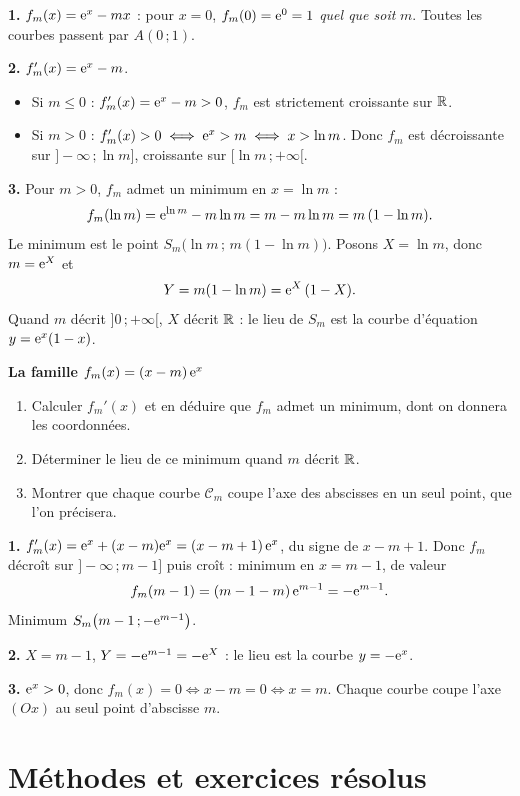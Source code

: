 \solution

\textbf{1.} $f_m(x)=\mathrm{e}^{x}-mx$ : pour $x=0$, $f_m(0)=\mathrm{e}^{0}=1$ \emph{quel que
soit} $m$. Toutes les courbes passent par $A(0\,;1)$.

\textbf{2.} $f_m'(x)=\mathrm{e}^{x}-m$.
\begin{itemize}[label=\textbullet]
	\item Si $m\leq 0$ : $f_m'(x)=\mathrm{e}^{x}-m>0$, $f_m$ est strictement croissante
	sur $\mathbb{R}$.
	\item Si $m>0$ : $f_m'(x)>0\iff \mathrm{e}^{x}>m\iff x>\ln m$. Donc $f_m$ est
	décroissante sur $]-\infty\,;\ln m]$, croissante sur $[\ln m\,;+\infty[$.
\end{itemize}

\textbf{3.} Pour $m>0$, $f_m$ admet un minimum en $x=\ln m$ :
\[
f_m(\ln m)=\mathrm{e}^{\ln m}-m\ln m=m-m\ln m=m\,(1-\ln m).
\]
Le minimum est le point $S_m\bigl(\ln m\,;\,m(1-\ln m)\bigr)$. Posons
$X=\ln m$, donc $m=\mathrm{e}^{X}$ et
\[
Y=m(1-\ln m)=\mathrm{e}^{X}\,(1-X).
\]
Quand $m$ décrit $]0\,;+\infty[$, $X$ décrit $\mathbb{R}$ : le lieu de $S_m$ est la
courbe d'équation $y=\mathrm{e}^{x}(1-x)$.

\exerciceresolu
\textbf{La famille $f_m(x)=(x-m)\,\mathrm{e}^{x}$}

\begin{enumerate}
	\item Calculer $f_m'(x)$ et en déduire que $f_m$ admet un minimum, dont on
	donnera les coordonnées.
	\item Déterminer le lieu de ce minimum quand $m$ décrit $\mathbb{R}$.
	\item Montrer que chaque courbe $\mathcal C_m$ coupe l'axe des abscisses en
	un seul point, que l'on précisera.
\end{enumerate}

\solution

\textbf{1.} $f_m'(x)=\mathrm{e}^{x}+(x-m)\mathrm{e}^{x}=(x-m+1)\,\mathrm{e}^{x}$, du signe de
$x-m+1$. Donc $f_m$ décroît sur $]-\infty\,;m-1]$ puis croît : minimum en
$x=m-1$, de valeur
\[
f_m(m-1)=(m-1-m)\,\mathrm{e}^{m-1}=-\mathrm{e}^{m-1}.
\]
Minimum $S_m\bigl(m-1\,;-\mathrm{e}^{m-1}\bigr)$.

\textbf{2.} $X=m-1$, $Y=-\mathrm{e}^{m-1}=-\mathrm{e}^{X}$ : le lieu est la courbe
$y=-\mathrm{e}^{x}$.

\textbf{3.} $\mathrm{e}^{x}>0$, donc $f_m(x)=0\iff x-m=0\iff x=m$. Chaque courbe
coupe l'axe $(Ox)$ au seul point d'abscisse $m$.


\section{Méthodes et exercices résolus}

